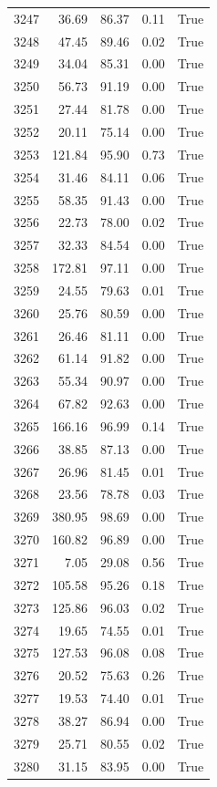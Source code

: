 \begin{longtable}{rrrrr}
3247 & 36.69 & 86.37 & 0.11 & True \\
3248 & 47.45 & 89.46 & 0.02 & True \\
3249 & 34.04 & 85.31 & 0.00 & True \\
3250 & 56.73 & 91.19 & 0.00 & True \\
3251 & 27.44 & 81.78 & 0.00 & True \\
3252 & 20.11 & 75.14 & 0.00 & True \\
3253 & 121.84 & 95.90 & 0.73 & True \\
3254 & 31.46 & 84.11 & 0.06 & True \\
3255 & 58.35 & 91.43 & 0.00 & True \\
3256 & 22.73 & 78.00 & 0.02 & True \\
3257 & 32.33 & 84.54 & 0.00 & True \\
3258 & 172.81 & 97.11 & 0.00 & True \\
3259 & 24.55 & 79.63 & 0.01 & True \\
3260 & 25.76 & 80.59 & 0.00 & True \\
3261 & 26.46 & 81.11 & 0.00 & True \\
3262 & 61.14 & 91.82 & 0.00 & True \\
3263 & 55.34 & 90.97 & 0.00 & True \\
3264 & 67.82 & 92.63 & 0.00 & True \\
3265 & 166.16 & 96.99 & 0.14 & True \\
3266 & 38.85 & 87.13 & 0.00 & True \\
3267 & 26.96 & 81.45 & 0.01 & True \\
3268 & 23.56 & 78.78 & 0.03 & True \\
3269 & 380.95 & 98.69 & 0.00 & True \\
3270 & 160.82 & 96.89 & 0.00 & True \\
3271 & 7.05 & 29.08 & 0.56 & True \\
3272 & 105.58 & 95.26 & 0.18 & True \\
3273 & 125.86 & 96.03 & 0.02 & True \\
3274 & 19.65 & 74.55 & 0.01 & True \\
3275 & 127.53 & 96.08 & 0.08 & True \\
3276 & 20.52 & 75.63 & 0.26 & True \\
3277 & 19.53 & 74.40 & 0.01 & True \\
3278 & 38.27 & 86.94 & 0.00 & True \\
3279 & 25.71 & 80.55 & 0.02 & True \\
3280 & 31.15 & 83.95 & 0.00 & True \\

\end{longtable}
